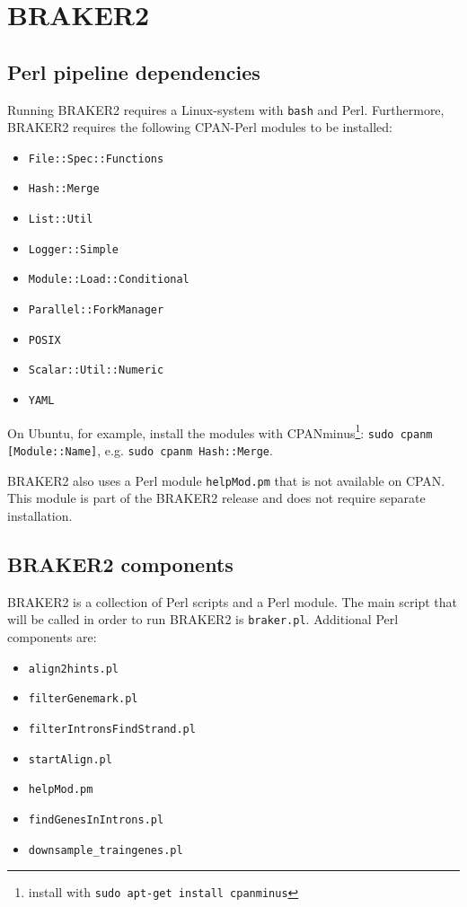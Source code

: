 \documentclass[a4paper,10pt]{report}
\begin{document}
\section{BRAKER2}

\subsection{Perl pipeline dependencies}

Running BRAKER2 requires a Linux-system with \texttt{bash} and Perl. Furthermore, BRAKER2 requires the following CPAN-Perl modules to be installed:

\begin{itemize}
 \item 		  \texttt{File::Spec::Functions}
				\item \texttt{Hash::Merge}
				\item \texttt{List::Util}
				\item \texttt{Logger::Simple}
				\item \texttt{Module::Load::Conditional}
				\item \texttt{Parallel::ForkManager}
				\item \texttt{POSIX}
				\item \texttt{Scalar::Util::Numeric}
				\item \texttt{YAML}
\end{itemize}

   	On Ubuntu, for example, install the modules with CPANminus\footnote{install with \texttt{sudo apt-get install cpanminus}}: \texttt{sudo cpanm [Module::Name]}, e.g. \texttt{sudo cpanm Hash::Merge}.

   BRAKER2 also uses a Perl module \texttt{helpMod.pm} that is not available on CPAN. This module is 
   part of the BRAKER2 release and does not require separate installation.  

\subsection{BRAKER2 components} \label{Executability}

BRAKER2 is a collection of Perl scripts and a Perl module. The main script that will be called in order to run BRAKER2 is \texttt{braker.pl}. Additional Perl components are:

\begin{itemize}
\item \texttt{align2hints.pl}
\item \texttt{filterGenemark.pl}
\item \texttt{filterIntronsFindStrand.pl}
\item \texttt{startAlign.pl}
\item \texttt{helpMod.pm}
\item \texttt{findGenesInIntrons.pl}
\item \texttt{downsample\_traingenes.pl}
\end{itemize}
\end{document}
